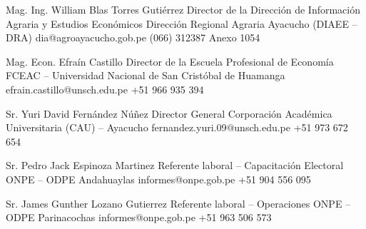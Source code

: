 

\begin{referees}
	
	{Mag. Ing. William Blas Torres Gutiérrez}
	{Director de la Dirección de Información Agraria y Estudios Económicos}
	{Dirección Regional Agraria Ayacucho (DIAEE -- DRA)}
	{dia@agroayacucho.gob.pe}
	{(066) 312387 Anexo 1054}
	
	{Mag. Econ. Efraín Castillo}
	{Director de la Escuela Profesional de Economía}
	{FCEAC -- Universidad Nacional de San Cristóbal de Huamanga}
	{efrain.castillo@unsch.edu.pe}
	{+51 966 935 394}
	
	{Sr. Yuri David Fernández Núñez}
	{Director General}
	{Corporación Académica Universitaria (CAU) -- Ayacucho}
	{fernandez.yuri.09@unsch.edu.pe}
	{+51 973 672 654}

	{Sr. Pedro Jack Espinoza Martinez}
	{Referente laboral -- Capacitación Electoral}
	{ONPE -- ODPE Andahuaylas}
	{informes@onpe.gob.pe}
	{+51 904 556 095}

	{Sr. James Gunther Lozano Gutierrez}
	{Referente laboral -- Operaciones}
	{ONPE -- ODPE Parinacochas}
	{informes@onpe.gob.pe}
	{+51 963 506 573}


\end{referees}
